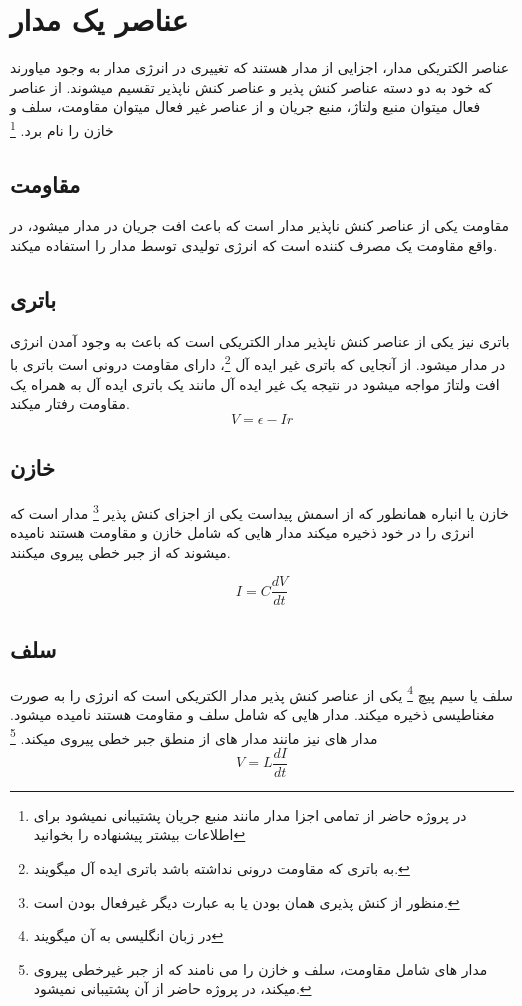 \section{عناصر یک مدار}
عناصر الکتریکی مدار، اجزایی از مدار هستند که تغییری در انرژی مدار به وجود میاورند که خود به دو دسته عناصر کنش پذیر و عناصر کنش ناپذیر تقسیم میشوند.
از عناصر فعال میتوان منبع ولتاژ، منبع جریان و از عناصر غیر فعال میتوان مقاومت، سلف و خازن را نام برد.
\footnote{	در پروژه حاضر از تمامی اجزا مدار مانند منبع جریان پشتیبانی نمیشود برای اطلاعات بیشتر پیشنهاده را بخوانید	}

\subsection{مقاومت}
مقاومت یکی از عناصر کنش ناپذیر مدار است که باعث افت جریان در مدار میشود،
در واقع مقاومت یک مصرف کننده است که انرژی تولیدی توسط مدار را استفاده میکند.
\subsection{باتری}
باتری نیز یکی از عناصر کنش ناپذیر مدار الکتریکی است که باعث به وجود آمدن انرژی در مدار میشود.
از آنجایی که باتری غیر ایده آل
\footnote{	به باتری که مقاومت درونی نداشته باشد باتری ایده آل میگویند.	}، 
دارای مقاومت درونی است باتری با افت ولتاژ مواجه میشود در نتیجه یک غیر ایده آل مانند یک باتری ایده آل به همراه یک مقاومت رفتار میکند.
\begin{equation}\label{eq:ohm}
	V=\epsilon - {I}{r}
\end{equation}
\subsection{خازن}
خازن یا انباره همانطور که از اسمش پیداست یکی از اجزای کنش پذیر
\footnote{منظور از کنش پذیری همان 
بودن یا به عبارت دیگر غیرفعال بودن است.
}
 مدار است که انرژی را در خود ذخیره میکند
مدار هایی که شامل خازن و مقاومت هستند
نامیده میشوند که از جبر خطی پیروی میکنند.

\begin{equation}\label{eq:capcur}
	I={C}\frac{dV}{dt}
\end{equation}
\subsection{سلف}
سلف یا سیم پیچ
\footnote{در زبان انگلیسی به آن
	میگویند}
 یکی از عناصر کنش پذیر مدار الکتریکی است که انرژی را به صورت مغناطیسی ذخیره میکند.
مدار هایی که شامل سلف و مقاومت هستند
نامیده میشود.
مدار های
نیز مانند مدار های
از منطق جبر خطی پیروی میکند.
\footnote{مدار های شامل مقاومت، سلف و خازن را 
می نامند که از جبر غیرخطی پیروی میکند، در پروژه حاضر از آن پشتیبانی نمیشود.	}
\begin{equation}\label{eq:capcur}
	V={L}\frac{dI}{dt}
\end{equation}

